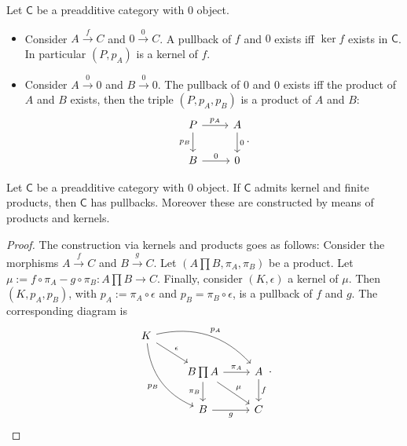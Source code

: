 \begin{ex}
	Let $\mathsf{C}$ be a preadditive category with $0$ object.
	\begin{itemize}
	\item Consider $A \xrightarrow{f} C$ and $0 \xrightarrow{0} C$.
		A pullback of $f$ and $0$ exists iff $\ker f$ exists in $\mathsf{C}$.
		In particular $\left(P, p_A\right)$ is a kernel of $f$.
	\item Consider $A \xrightarrow{0} 0$ and $B \xrightarrow{0} 0$.
		The pullback of $0$ and $0$ exists iff the product of $A$ and $B$ exists, then the triple $\left(P, p_A, p_B\right)$ is a product of $A$ and $B$:
		\begin{equation}
		\begin{tikzcd}
			P \arrow[r, "p_A", rightarrow] \arrow[d, "p_B"', rightarrow] & A \arrow[d, "0", rightarrow] \\
			B \arrow[r, "0", rightarrow] & 0
		\end{tikzcd}
		.\end{equation} 
	\end{itemize}
\end{ex} 

\begin{prop}
	Let $\mathsf{C}$ be a preadditive category with $0$ object.
	If $\mathsf{C}$ admits kernel and finite products, then $\mathsf{C}$ has pullbacks.
	Moreover these are constructed by means of products and kernels.
\end{prop} 
\begin{proof}
	The construction via kernels and products goes as follows:
	Consider the morphisms $A \xrightarrow{f} C$ and $B \xrightarrow{g} C$.
	Let $\left(A \prod B, \pi_A, \pi_B\right)$ be a product.
	Let $\mu := f \circ \pi_A - g \circ \pi_B: A \prod B \to C$.
	Finally, consider $\left(K, \epsilon\right)$ a kernel of $\mu$.
	Then $\left(K, p_A, p_B\right)$, with $p_A := \pi_A \circ \epsilon$ and $p_B = \pi_B \circ \epsilon$, is a pullback of $f$ and $g$.
	The corresponding diagram is
	\begin{equation}
	\begin{tikzcd}
		K \arrow[rd, "\epsilon", rightarrow] \arrow[rrd, "p_A", rightarrow, bend left] \arrow[rdd, "p_B"', rightarrow, bend right] & & \\
	   & B \prod A \arrow[r, "\pi_A", rightarrow] \arrow[d, "\pi_B"', rightarrow] \arrow[rd, "\mu", rightarrow] & A \arrow[d, "f", rightarrow] \\
	   & B \arrow[r, "g"', rightarrow] & C
	\end{tikzcd}
	.\end{equation} 
\end{proof}

